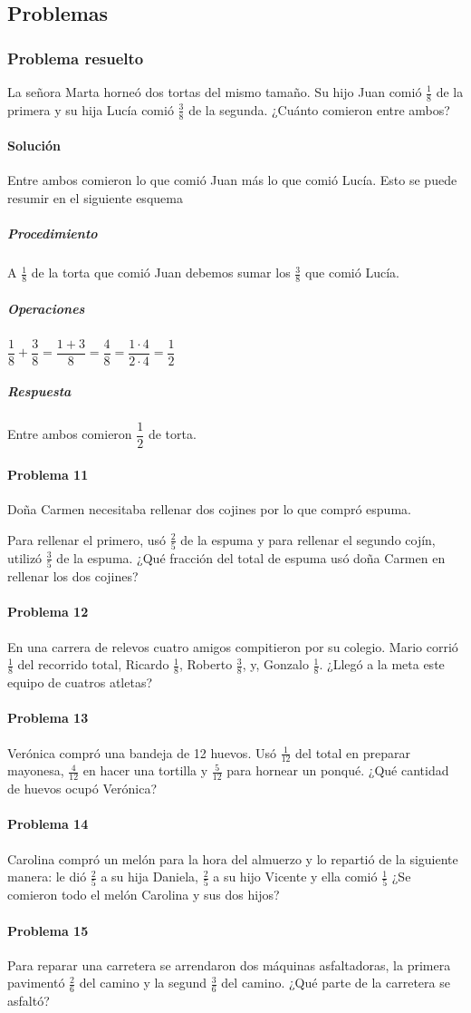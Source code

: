 \documentclass[10pt,twoside]{article}
\begin{document}
\subsection*{Problemas}
\subsubsection*{Problema resuelto}
La señora Marta horneó dos tortas del mismo tamaño. Su hijo Juan comió $\frac{1}{8}$ de la primera y su hija Lucía comió $\frac{3}{8}$ de la segunda. ¿Cuánto comieron entre ambos?
\paragraph*{Solución}
Entre ambos comieron lo que comió Juan más lo que comió Lucía. Esto se puede resumir en el siguiente esquema
\subparagraph*{Procedimiento}
A $\frac{1}{8}$ de la torta que comi\'{o} Juan debemos sumar los $\frac{3}{8}$ que comi\'{o} Luc\'{i}a.
\subparagraph*{Operaciones}
$\dfrac{1}{8}+\dfrac{3}{8}=\dfrac{1+3}{8}=\dfrac{4}{8}=\dfrac{1\cdot 4}{2\cdot 4}=\dfrac{1}{2}$
\subparagraph*{Respuesta}
Entre ambos comieron $\dfrac{1}{2}$ de torta.
\paragraph*{Problema 11}
Doña Carmen necesitaba rellenar dos cojines por lo que compró espuma.

Para rellenar el primero, usó $\frac{2}{5}$ de la espuma y para rellenar el segundo cojín, utilizó $\frac{3}{5}$ de la espuma. ¿Qué fracción del total de espuma usó doña Carmen en rellenar los dos cojines?
\paragraph*{Problema 12}
En una carrera de relevos cuatro amigos compitieron por su colegio. Mario corrió $\frac{1}{8}$ del recorrido total, Ricardo $\frac{1}{8}$, Roberto $\frac{3}{8}$, y, Gonzalo $\frac{1}{8}$. ¿Llegó a la meta este equipo de cuatros atletas?
\paragraph*{Problema 13}
Verónica compró una bandeja de 12 huevos. Usó $\frac{1}{12}$ del total en preparar mayonesa, $\frac{4}{12}$ en hacer una tortilla y $\frac{5}{12}$ para hornear un ponqué. ¿Qué cantidad de huevos ocupó Verónica?
\paragraph*{Problema 14}
Carolina compró un melón para la hora del almuerzo y lo repartió de la siguiente manera: le dió $\frac{2}{5}$ a su hija Daniela, $\frac{2}{5}$ a su hijo Vicente y ella comió $\frac{1}{5}$ ¿Se comieron todo el melón Carolina y sus dos hijos?
\paragraph*{Problema 15}
Para reparar una carretera se arrendaron dos máquinas asfaltadoras, la primera pavimentó $\frac{2}{6}$ del camino y la segund $\frac{3}{6}$ del camino. ¿Qué parte de la carretera se asfaltó?
\end{document}
